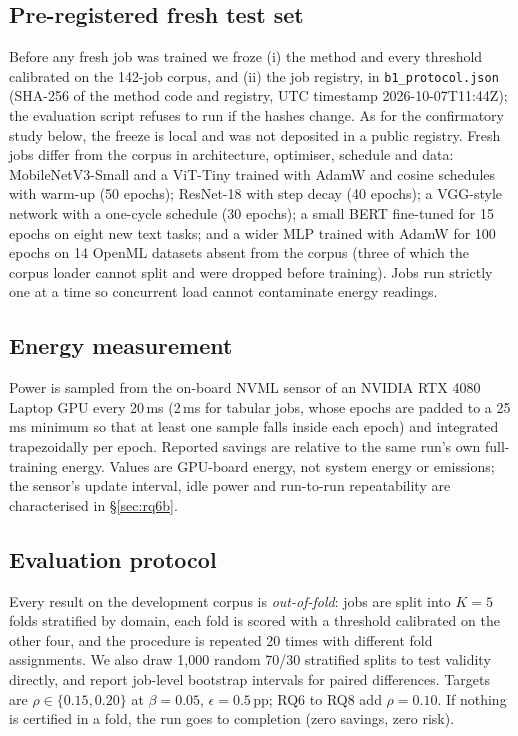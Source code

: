 \documentclass[3p,twocolumn,10pt]{elsarticle}
\theoremstyle{definition}
\begin{document}
\subsection{Pre-registered fresh test set}
\label{sec:b1setup}
Before any fresh job was trained we froze (i) the method and every threshold calibrated on the 142-job corpus, and (ii) the job registry, in \texttt{b1\_protocol.json} (SHA-256 of the method code and registry, UTC timestamp 2026-10-07T11:44Z); the evaluation script refuses to run if the hashes change. As for the confirmatory study below, the freeze is local and was not deposited in a public registry. Fresh jobs differ from the corpus in architecture, optimiser, schedule and data: MobileNetV3-Small \citep{howard2019mobilenetv3} and a ViT-Tiny \citep{dosovitskiy2021vit} trained with AdamW \citep{loshchilov2019adamw} and cosine schedules with warm-up (50 epochs); ResNet-18 \citep{he2016resnet} with step decay (40 epochs); a VGG-style network with a one-cycle schedule (30 epochs); a small BERT \citep{turc2019wellread} fine-tuned for 15 epochs on eight new text tasks; and a wider MLP trained with AdamW for 100 epochs on 14 OpenML datasets absent from the corpus (three of which the corpus loader cannot split and were dropped before training). Jobs run strictly one at a time so concurrent load cannot contaminate energy readings.

\subsection{Energy measurement}
\label{sec:energy}
Power is sampled from the on-board NVML sensor of an NVIDIA RTX 4080 Laptop GPU every 20\,ms (2\,ms for tabular jobs, whose epochs are padded to a 25\,ms minimum so that at least one sample falls inside each epoch) and integrated trapezoidally per epoch. Reported savings are relative to the same run's own full-training energy. Values are GPU-board energy, not system energy or emissions; the sensor's update interval, idle power and run-to-run repeatability are characterised in \S\ref{sec:rq6b}.

\subsection{Evaluation protocol}
\label{sec:protocol}
Every result on the development corpus is \emph{out-of-fold}: jobs are split into $K{=}5$ folds stratified by domain, each fold is scored with a threshold calibrated on the other four, and the procedure is repeated 20 times with different fold assignments. We also draw 1{,}000 random 70/30 stratified splits to test validity directly, and report job-level bootstrap intervals for paired differences. Targets are $\rho\in\{0.15,0.20\}$ at $\beta=0.05$, $\epsilon=0.5$\,pp; RQ6 to RQ8 add $\rho=0.10$. If nothing is certified in a fold, the run goes to completion (zero savings, zero risk).
\end{document}
